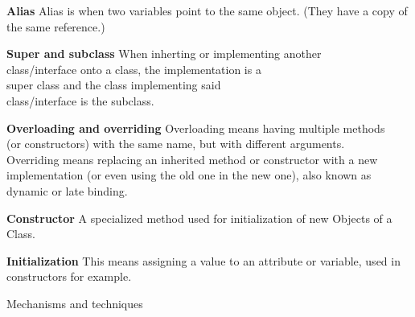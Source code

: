 \documentclass{article}
\begin{document}
\begin{Parallel}[v]{0.49\textwidth}{0.49\textwidth}
{        \textbf{Alias}\newline
        Alias is when two variables point to the same object.
        (They have a copy of the same reference.)
        \\

        \textbf{Super and subclass}\newline
        When inherting or implementing another\\
        class/interface onto a class, the implementation is a\\
        super class and the class implementing said\\
        class/interface is the subclass.

        \textbf{Overloading and overriding}\newline
        Overloading means having multiple methods \\
        (or constructors) with the same name, but with different arguments.\\
        Overriding means replacing an inherited method or constructor with a new implementation
        (or even using the old one in the new one), also known as dynamic or late binding.

        \textbf{Constructor}\newline
        A specialized method used for initialization of new Objects of a Class.

        \textbf{Initialization}\newline
        This means assigning a value to an attribute or variable, used in constructors for example.
    }
    \ParallelPar
\end{Parallel}

\newpage
\begin{center}
    {\huge Mechanisms and techniques}
\end{center}
\end{document}
